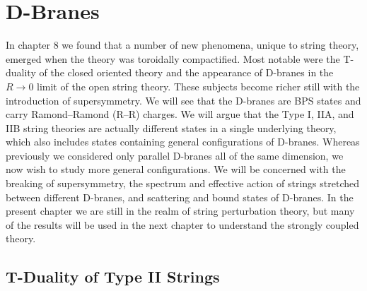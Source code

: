 \providecommand{\slashed}[1]{\not{#1}}
\chapter{\texorpdfstring{D-Branes}{13 D-Branes}} \label{cha:13}

In chapter 8 we found that a number of new phenomena, unique to string theory, emerged when the theory was toroidally compactified. Most notable were the T-duality of the closed oriented theory and the appearance of D-branes in the $R \to 0$ limit of the open string theory. These subjects become richer still with the introduction of supersymmetry. We will see that the D-branes are BPS states and carry Ramond--Ramond (R--R) charges. We will argue that the Type I, IIA, and IIB string theories are actually different states in a single underlying theory, which also includes states containing general configurations of D-branes. Whereas previously we considered only parallel D-branes all of the same dimension, we now wish to study more general configurations. We will be concerned with the breaking of supersymmetry, the spectrum and effective action of strings stretched between different D-branes, and scattering and bound states of D-branes. In the present chapter we are still in the realm of string perturbation theory, but many of the results will be used in the next chapter to understand the strongly coupled theory.

\section{T-Duality of Type II Strings}

